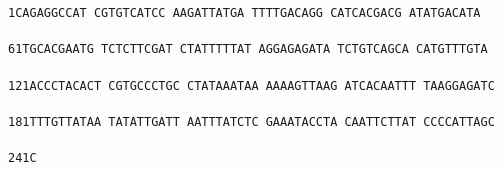 \documentclass[11pt,twoside,reqno,a4paper]{article}
\begin{document}
\texttt{1\hspace*{3\charwidth}CAGAGGCCAT	CGTGTCATCC	AAGATTATGA	TTTTGACAGG	CATCACGACG	ATATGACATA	\\
\hspace*{4\charwidth}\hspace*{1\charwidth}\hspace*{1\charwidth}\hspace*{1\charwidth}\hspace*{1\charwidth}\hspace*{1\charwidth}\hspace*{1\charwidth}\\
61\hspace*{2\charwidth}TGCACGAATG	TCTCTTCGAT	CTATTTTTAT	AGGAGAGATA	TCTGTCAGCA	CATGTTTGTA	\\
\hspace*{4\charwidth}\hspace*{1\charwidth}\hspace*{1\charwidth}\hspace*{1\charwidth}\hspace*{1\charwidth}\hspace*{1\charwidth}\hspace*{1\charwidth}\\
121\hspace*{1\charwidth}ACCCTACACT	CGTGCCCTGC	CTATAAATAA	AAAAGTTAAG	ATCACAATTT	TAAGGAGATC	\\
\hspace*{4\charwidth}\hspace*{1\charwidth}\hspace*{1\charwidth}\hspace*{1\charwidth}\hspace*{1\charwidth}\hspace*{1\charwidth}\hspace*{1\charwidth}\\
181\hspace*{1\charwidth}TTTGTTATAA	TATATTGATT	AATTTATCTC	GAAATACCTA	CAATTCTTAT	CCCCATTAGC	\\
\hspace*{4\charwidth}\hspace*{1\charwidth}\hspace*{1\charwidth}\hspace*{1\charwidth}\hspace*{1\charwidth}\hspace*{1\charwidth}\hspace*{1\charwidth}\\
241\hspace*{1\charwidth}C\\
\hspace*{4\charwidth}\\
}
\end{document}
